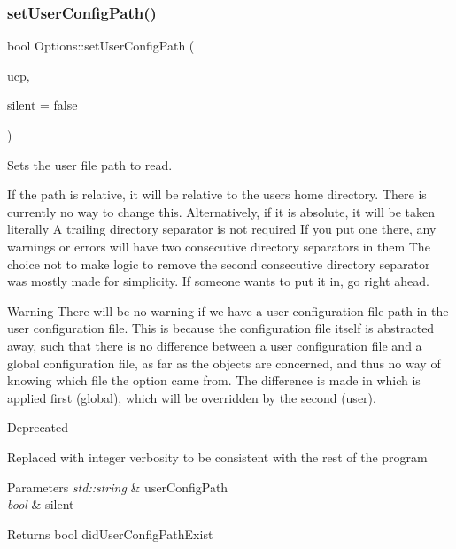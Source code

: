 \subsubsection{\texorpdfstring{setUserConfigPath()}{setUserConfigPath()}\hspace{0.1cm}{\footnotesize\ttfamily [1/2]}}
{\footnotesize\ttfamily bool Options\+::set\+User\+Config\+Path (\begin{DoxyParamCaption}\item[{std\+::string}]{ucp,  }\item[{bool}]{silent = {\ttfamily false} }\end{DoxyParamCaption})}



Sets the user file path to read. 

If the path is relative, it will be relative to the user\textquotesingle{}s home directory. There is currently no way to change this. Alternatively, if it is absolute, it will be taken literally A trailing directory separator is not required If you put one there, any warnings or errors will have two consecutive directory separators in them The choice not to make logic to remove the second consecutive directory separator was mostly made for simplicity. If someone wants to put it in, go right ahead.

\begin{DoxyWarning}{Warning}
There will be no warning if we have a user configuration file path in the user configuration file. This is because the configuration file itself is abstracted away, such that there is no difference between a user configuration file and a global configuration file, as far as the objects are concerned, and thus no way of knowing which file the option came from. The difference is made in which is applied first (global), which will be overridden by the second (user).
\end{DoxyWarning}
\begin{DoxyRefDesc}{Deprecated}
\item[\mbox{\hyperlink{deprecated__deprecated000010}{Deprecated}}]Replaced with integer verbosity to be consistent with the rest of the program\end{DoxyRefDesc}



\begin{DoxyParams}{Parameters}
{\em std\+::string} & user\+Config\+Path \\
\hline
{\em bool} & silent\\
\hline
\end{DoxyParams}
\begin{DoxyReturn}{Returns}
bool did\+User\+Config\+Path\+Exist 
\end{DoxyReturn}
\mbox{\label{classOptions_af17a3e422800b36d8900c5bf0f794317}} 
